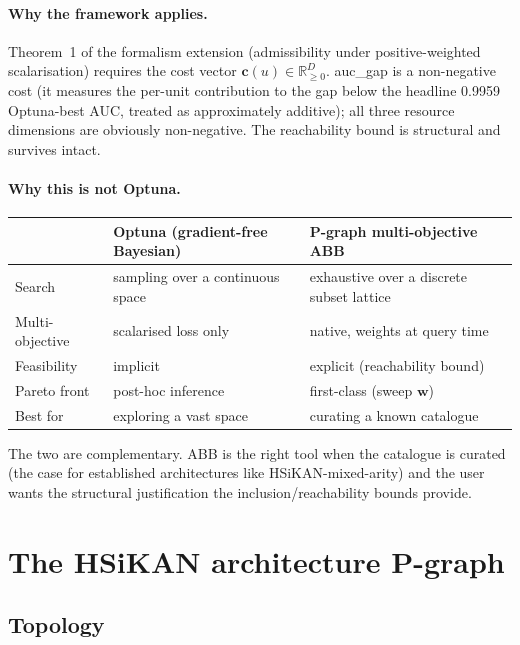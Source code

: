 \documentclass[11pt,a4paper]{article}
\begin{document}
\paragraph{Why the framework applies.} Theorem~1 of the formalism
extension (admissibility under positive-weighted scalarisation)
requires the cost vector $\boldsymbol{c}(u) \in \mathbb{R}_{\geq 0}^D$.
\textsf{auc\_gap} is a non-negative cost (it measures the per-unit
contribution to the gap below the headline 0.9959 Optuna-best AUC,
treated as approximately additive); all three resource dimensions
are obviously non-negative. The reachability bound is structural
and survives intact.

\paragraph{Why this is not Optuna.}
\begin{center}\small
\begin{tabularx}{0.98\linewidth}{lXX}
\toprule
 & Optuna (gradient-free Bayesian) & P-graph multi-objective ABB \\
\midrule
Search & sampling over a continuous space & exhaustive over a discrete subset lattice \\
Multi-objective & scalarised loss only & native, weights at query time \\
Feasibility & implicit & explicit (reachability bound) \\
Pareto front & post-hoc inference & first-class (sweep $\boldsymbol{w}$) \\
Best for & exploring a vast space & curating a known catalogue \\
\bottomrule
\end{tabularx}
\end{center}
The two are complementary. ABB is the right tool when the
catalogue is curated (the case for established architectures like
HSiKAN-mixed-arity) and the user wants the structural justification
the inclusion/reachability bounds provide.

\section{The HSiKAN architecture P-graph}

\subsection{Topology}
\end{document}
